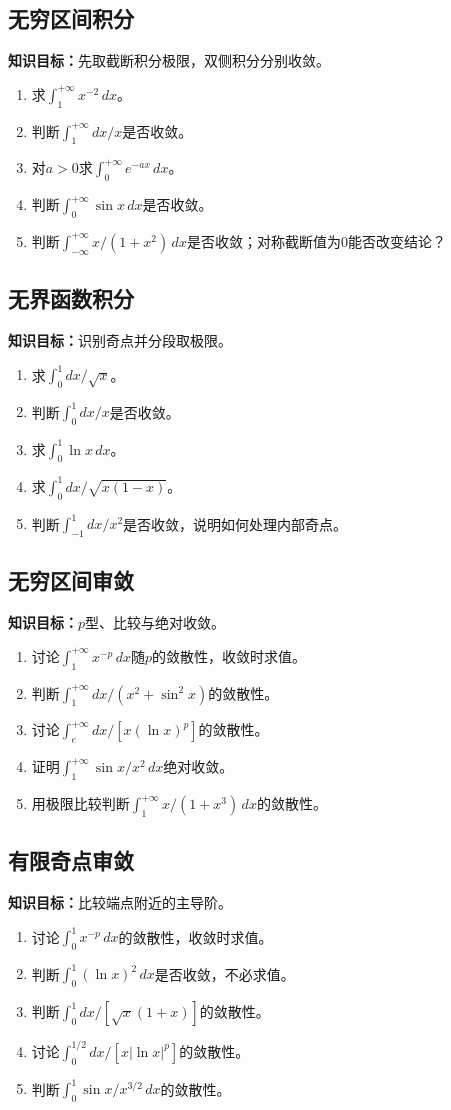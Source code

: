 \documentclass[11pt,a4paper,fontset=fandol]{ctexrep}
\newcommand{\goal}[1]{\textbf{知识目标：}#1\par}
\begin{document}
\subsection{无穷区间积分}
\goal{先取截断积分极限，双侧积分分别收敛。}
\begin{enumerate}
\item 求$\int_1^{+\infty}x^{-2}\,dx$。
\item 判断$\int_1^{+\infty}dx/x$是否收敛。
\item 对$a>0$求$\int_0^{+\infty}e^{-ax}\,dx$。
\item 判断$\int_0^{+\infty}\sin x\,dx$是否收敛。
\item 判断$\int_{-\infty}^{+\infty}x/(1+x^2)\,dx$是否收敛；对称截断值为0能否改变结论？
\end{enumerate}
\subsection{无界函数积分}
\goal{识别奇点并分段取极限。}
\begin{enumerate}
\item 求$\int_0^1 dx/\sqrt x$。
\item 判断$\int_0^1 dx/x$是否收敛。
\item 求$\int_0^1\ln x\,dx$。
\item 求$\int_0^1 dx/\sqrt{x(1-x)}$。
\item 判断$\int_{-1}^1 dx/x^2$是否收敛，说明如何处理内部奇点。
\end{enumerate}
\subsection{无穷区间审敛}
\goal{$p$型、比较与绝对收敛。}
\begin{enumerate}
\item 讨论$\int_1^{+\infty}x^{-p}\,dx$随$p$的敛散性，收敛时求值。
\item 判断$\int_1^{+\infty}dx/(x^2+\sin^2x)$的敛散性。
\item 讨论$\int_e^{+\infty}dx/[x(\ln x)^p]$的敛散性。
\item 证明$\int_1^{+\infty}\sin x/x^2\,dx$绝对收敛。
\item 用极限比较判断$\int_1^{+\infty}x/(1+x^3)\,dx$的敛散性。
\end{enumerate}
\subsection{有限奇点审敛}
\goal{比较端点附近的主导阶。}
\begin{enumerate}
\item 讨论$\int_0^1x^{-p}\,dx$的敛散性，收敛时求值。
\item 判断$\int_0^1(\ln x)^2\,dx$是否收敛，不必求值。
\item 判断$\int_0^1 dx/[\sqrt x(1+x)]$的敛散性。
\item 讨论$\int_0^{1/2}dx/[x|\ln x|^p]$的敛散性。
\item 判断$\int_0^1\sin x/x^{3/2}\,dx$的敛散性。
\end{enumerate}
\end{document}
